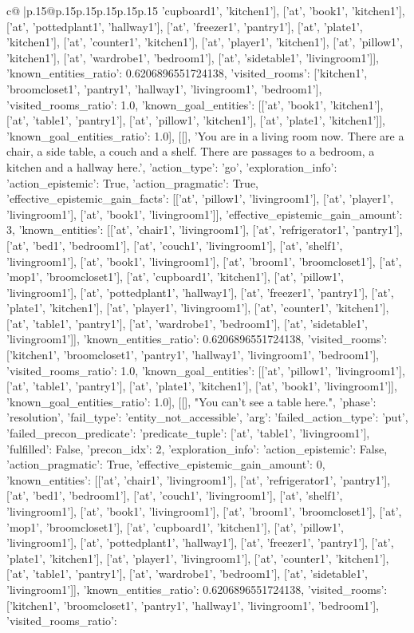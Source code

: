 \documentclass{article}
\begin{document}
{\begin{supertabular}{c@{$\;$}|p{.15\linewidth}@{}p{.15\linewidth}p{.15\linewidth}p{.15\linewidth}p{.15\linewidth}p{.15\linewidth}}
{{{'cupboard1', 'kitchen1'], ['at', 'book1', 'kitchen1'], ['at', 'pottedplant1', 'hallway1'], ['at', 'freezer1', 'pantry1'], ['at', 'plate1', 'kitchen1'], ['at', 'counter1', 'kitchen1'], ['at', 'player1', 'kitchen1'], ['at', 'pillow1', 'kitchen1'], ['at', 'wardrobe1', 'bedroom1'], ['at', 'sidetable1', 'livingroom1']], 'known_entities_ratio': 0.6206896551724138, 'visited_rooms': ['kitchen1', 'broomcloset1', 'pantry1', 'hallway1', 'livingroom1', 'bedroom1'], 'visited_rooms_ratio': 1.0, 'known_goal_entities': [['at', 'book1', 'kitchen1'], ['at', 'table1', 'pantry1'], ['at', 'pillow1', 'kitchen1'], ['at', 'plate1', 'kitchen1']], 'known_goal_entities_ratio': 1.0}}], [[], 'You are in a living room now. There are a chair, a side table, a couch and a shelf. There are passages to a bedroom, a kitchen and a hallway here.', {'action_type': 'go', 'exploration_info': {'action_epistemic': True, 'action_pragmatic': True, 'effective_epistemic_gain_facts': [['at', 'pillow1', 'livingroom1'], ['at', 'player1', 'livingroom1'], ['at', 'book1', 'livingroom1']], 'effective_epistemic_gain_amount': 3, 'known_entities': [['at', 'chair1', 'livingroom1'], ['at', 'refrigerator1', 'pantry1'], ['at', 'bed1', 'bedroom1'], ['at', 'couch1', 'livingroom1'], ['at', 'shelf1', 'livingroom1'], ['at', 'book1', 'livingroom1'], ['at', 'broom1', 'broomcloset1'], ['at', 'mop1', 'broomcloset1'], ['at', 'cupboard1', 'kitchen1'], ['at', 'pillow1', 'livingroom1'], ['at', 'pottedplant1', 'hallway1'], ['at', 'freezer1', 'pantry1'], ['at', 'plate1', 'kitchen1'], ['at', 'player1', 'livingroom1'], ['at', 'counter1', 'kitchen1'], ['at', 'table1', 'pantry1'], ['at', 'wardrobe1', 'bedroom1'], ['at', 'sidetable1', 'livingroom1']], 'known_entities_ratio': 0.6206896551724138, 'visited_rooms': ['kitchen1', 'broomcloset1', 'pantry1', 'hallway1', 'livingroom1', 'bedroom1'], 'visited_rooms_ratio': 1.0, 'known_goal_entities': [['at', 'pillow1', 'livingroom1'], ['at', 'table1', 'pantry1'], ['at', 'plate1', 'kitchen1'], ['at', 'book1', 'livingroom1']], 'known_goal_entities_ratio': 1.0}}], [[], "You can't see a table here.", {'phase': 'resolution', 'fail_type': 'entity_not_accessible', 'arg': {'failed_action_type': 'put', 'failed_precon_predicate': {'predicate_tuple': ['at', 'table1', 'livingroom1'], 'fulfilled': False, 'precon_idx': 2}}, 'exploration_info': {'action_epistemic': False, 'action_pragmatic': True, 'effective_epistemic_gain_amount': 0, 'known_entities': [['at', 'chair1', 'livingroom1'], ['at', 'refrigerator1', 'pantry1'], ['at', 'bed1', 'bedroom1'], ['at', 'couch1', 'livingroom1'], ['at', 'shelf1', 'livingroom1'], ['at', 'book1', 'livingroom1'], ['at', 'broom1', 'broomcloset1'], ['at', 'mop1', 'broomcloset1'], ['at', 'cupboard1', 'kitchen1'], ['at', 'pillow1', 'livingroom1'], ['at', 'pottedplant1', 'hallway1'], ['at', 'freezer1', 'pantry1'], ['at', 'plate1', 'kitchen1'], ['at', 'player1', 'livingroom1'], ['at', 'counter1', 'kitchen1'], ['at', 'table1', 'pantry1'], ['at', 'wardrobe1', 'bedroom1'], ['at', 'sidetable1', 'livingroom1']], 'known_entities_ratio': 0.6206896551724138, 'visited_rooms': ['kitchen1', 'broomcloset1', 'pantry1', 'hallway1', 'livingroom1', 'bedroom1'], 'visited_rooms_ratio': }}}
\end{supertabular}}
\end{document}

